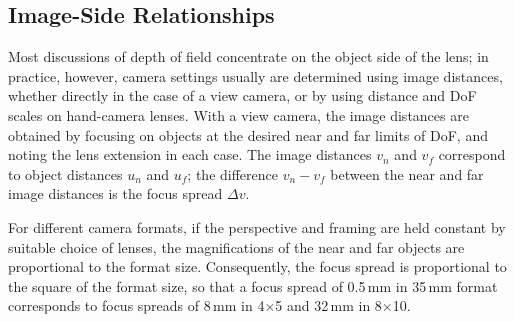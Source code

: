 \documentclass[11pt, oneside]{scrartcl}   	%
\newcommand{\Dv}{\ensuremath{\Delta v}}
\begin{document}
\subsection{Image-Side Relationships}
Most discussions of depth of field concentrate on the object side of the lens; in practice, however, camera settings usually are determined using image distances, whether directly in the case of a view camera, or by using distance and DoF scales on hand-camera lenses. With a view camera, the image distances are obtained by focusing on objects at the desired near and far limits of DoF, and noting the lens extension in each case. The image distances $v_n$ and $v_f$ correspond to object distances $u_n$ and $u_f$; the difference $v_n-v_f$ between the near and far image distances is the focus spread $\Dv$.

For different camera formats, if the perspective and framing are held constant by suitable choice of lenses, the magnifications of the near and far objects are proportional to the format size. Consequently, the focus spread is proportional to the square of the format size, so that a focus spread of 0.5\,mm in 35\,mm format corresponds to focus spreads of 8\,mm in 4$\times$5 and 32\,mm in 8$\times$10.
\end{document}
